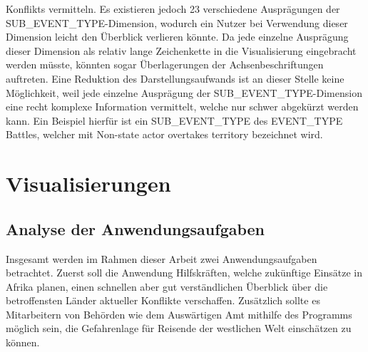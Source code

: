 \documentclass[usegeometry=true]{scrartcl}
\begin{document}
Konflikts vermitteln. Es existieren jedoch 23 verschiedene Ausprägungen der SUB\_EVENT\_TYPE-Dimension, wodurch ein Nutzer bei Verwendung dieser Dimension leicht den Überblick verlieren könnte. Da jede einzelne Ausprägung dieser Dimension als relativ lange Zeichenkette in die Visualisierung eingebracht werden müsste, könnten sogar Überlagerungen der Achsenbeschriftungen auftreten. Eine Reduktion des Darstellungsaufwands ist an dieser Stelle keine Möglichkeit, weil jede einzelne Ausprägung der SUB\_EVENT\_TYPE-Dimension eine recht komplexe Information vermittelt, welche nur schwer abgekürzt werden kann. Ein Beispiel hierfür ist ein SUB\_EVENT\_TYPE des EVENT\_TYPE \glqq Battles\grqq{}, welcher mit \glqq Non-state actor overtakes territory\grqq{} bezeichnet wird.\\

\section{Visualisierungen}
\subsection{Analyse der Anwendungsaufgaben}

Insgesamt werden im Rahmen dieser Arbeit zwei Anwendungsaufgaben betrachtet. Zuerst soll die Anwendung Hilfskräften, welche zukünftige Einsätze in Afrika planen, einen schnellen aber gut verständlichen Überblick über die betroffensten Länder aktueller Konflikte verschaffen. Zusätzlich sollte es Mitarbeitern von Behörden wie dem Auswärtigen Amt mithilfe des Programms möglich sein, die Gefahrenlage für Reisende der westlichen Welt einschätzen zu können.\\
\end{document}
